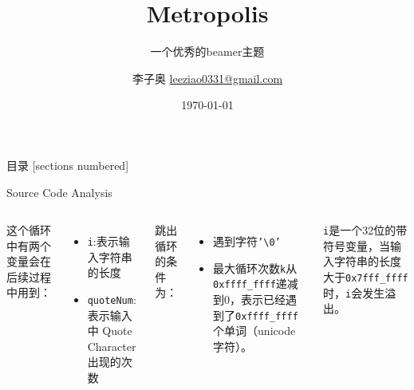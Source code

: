 \documentclass[8pt,UTF8]{ctexbeamer}
\title{Metropolis} %
\subtitle{一个优秀的beamer主题} %
\date{\today} %
\author{李子奥 \hspace{2em} \href{mailto: leeziao0331@gmail.com}{leeziao0331@gmail.com}} %
\institute{华中科技大学 \hspace{4em} 人工智能与自动化学院} %
\begin{document}
\maketitle %

\begin{frame}{目录}
  [sections numbered]
  \tableofcontents%
\end{frame}

\begin{frame}[fragile]{Source Code Analysis}
  \begin{columns}[T,onlytextwidth]
	\changefontsize[8pt]{8pt}
	
	\changefontsize[6pt]{6pt}
	\noindent 这个循环中有两个变量会在后续过程中用到：
	\begin{itemize}
		\item \texttt{i}:表示输入字符串的长度
		\item \texttt{quoteNum}:表示输入中 \small{Quote Character} 出现的次数
	\end{itemize}
	跳出循环的条件为：
	\begin{itemize}
		\item 遇到字符\texttt{'\textbackslash 0'}
		\item 最大循环次数\texttt{k}从\texttt{0xffff\_ffff}递减到0，表示已经遇到了\texttt{0xffff\_ffff}个单词（unicode字符）。
	\end{itemize}
	\pause
	\texttt{i}是一个32位的带符号变量，当输入字符串的长度大于\texttt{0x7fff\_ffff}时，\texttt{i}会发生溢出。
  \end{columns}
\end{frame}
\end{document}
